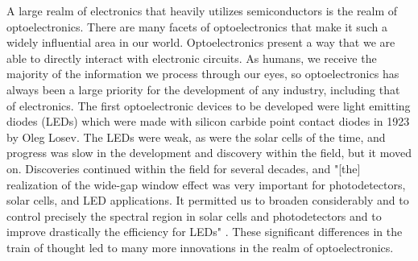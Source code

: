 \documentclass[12pt]{article}
\begin{document}
\begin{flushleft}
A large realm of electronics that heavily utilizes
semiconductors is the realm of optoelectronics. There
are many facets of optoelectronics that make it such
a widely influential area in our world. Optoelectronics
present a way that we are able to directly interact
with electronic circuits. As humans, we receive the
majority of the information we process through our
eyes, so optoelectronics has always been a large priority
for the development of any industry, including that
of electronics. The first optoelectronic devices to
be developed were light emitting diodes (LEDs) which
were made with silicon carbide point contact diodes
in 1923 by Oleg Losev. The LEDs were weak, as were
the solar cells of the time, and progress was slow
in the development and discovery within the field,
but it moved on. Discoveries continued within the field
for several decades, and "[the] realization of the
wide-gap window effect was very important for photodetectors,
solar cells, and LED applications. It permitted us
to broaden considerably and to control precisely the
spectral region in solar cells and photodetectors and
to improve drastically the efficiency for LEDs" \parencite{ZhoresOpto}.
These significant differences in the train of thought
led to many more innovations in the realm of optoelectronics.


\newpage
\nocite{*}
\printbibliography

\end{flushleft}
\end{document}
